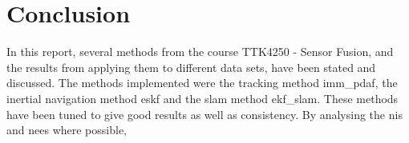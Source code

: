 \section{Conclusion}\label{sec:conclusion}
In this report, several methods from the course TTK4250 - Sensor Fusion, and the results from applying them to different data sets, have been stated and discussed. The methods implemented were the tracking method \acrshort{imm_pdaf}, the inertial navigation method \acrshort{eskf} and the \acrshort{slam} method \acrshort{ekf_slam}. These methods have been tuned to give good results as well as consistency. By analysing the \acrshort{nis} and \acrshort{nees} where possible, 





